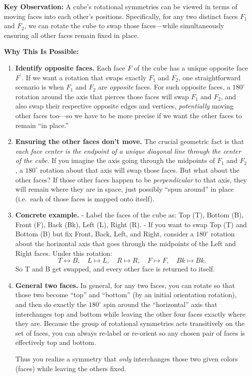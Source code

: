 \documentclass[12pt]{article}
\theoremstyle{definition} %
\theoremstyle{plain} %
\begin{document}
\bigskip

\noindent
\textbf{Key Observation:} 
A cube’s rotational symmetries can be viewed in terms of moving faces into each other’s positions. Specifically, for any two distinct faces \(F_1\) and \(F_2\), we can rotate the cube to swap those faces—while simultaneously ensuring all other faces remain fixed in place.

\bigskip

\noindent
\textbf{Why This Is Possible:}

\begin{enumerate}
    \item \textbf{Identify opposite faces.}  
    Each face \(F\) of the cube has a unique opposite face \(F^\prime\). If we want a rotation that swaps exactly \(F_1\) and \(F_2\), one straightforward scenario is when \(F_1\) and \(F_2\) are \emph{opposite} faces. For such opposite faces, a \(180^\circ\) rotation around the axis that pierces those faces will swap \(F_1\) and \(F_2\), and also swap their respective opposite edges and vertices, \emph{potentially} moving other faces too—so we have to be more precise if we want the other faces to remain “in place.”

    \item \textbf{Ensuring the other faces don’t move.}  
    The crucial geometric fact is that \emph{each face center is the endpoint of a unique diagonal line through the center of the cube}. If you imagine the axis going through the midpoints of \(F_1\) and \(F_2\), a \(180^\circ\) rotation about that axis will swap those faces. But what about the other faces? If those other faces happen to be \emph{perpendicular} to that axis, they will remain where they are in space, just possibly “spun around” in place (i.e.\ each of those faces is mapped onto itself).

    \item \textbf{Concrete example.}
    - Label the faces of the cube as: Top (T), Bottom (B), Front (F), Back (Bk), Left (L), Right (R).  
    - If you want to swap Top (T) and Bottom (B) but fix Front, Back, Left, and Right, consider a \(180^\circ\) rotation about the horizontal axis that goes through the midpoints of the Left and Right faces. Under this rotation:
    \[
    T \leftrightarrow B,\quad
    L \mapsto L,\quad
    R \mapsto R,\quad
    F \mapsto F,\quad
    Bk \mapsto Bk.
    \]
    So T and B get swapped, and every other face is returned to itself.

    \item \textbf{General two faces.}  
    In general, for any two faces, you can rotate so that those two become “top” and “bottom” (by an initial orientation rotation), and then do exactly the \(180^\circ\) spin around the “horizontal” axis that interchanges top and bottom while leaving the other four faces exactly where they are. Because the group of rotational symmetries acts transitively on the set of faces, you can always re-label or re-orient so any chosen pair of faces is effectively top and bottom.  

    Thus you realize a symmetry that \emph{only} interchanges those two given colors (faces) while leaving the others fixed.

\end{enumerate}
\end{document}
